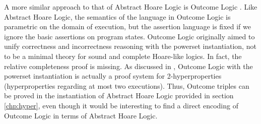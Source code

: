 \documentclass[
  10pt,       %
  twoside,    %
  a4paper,    %
  english,    %
  tikz,       %
  openright,  %
]{book}
\begin{document}
A more similar approach to that of Abstract Hoare Logic is Outcome Logic
\cite{Zilberstein23}. Like Abstract Hoare Logic, the semantics of the language
in Outcome Logic is parametric on the domain of execution, but the assertion
language is fixed if we ignore the basic assertions on program states. Outcome
Logic originally aimed to unify correctness and incorrectness reasoning with
the powerset instantiation, not to be a minimal theory for sound and complete
Hoare-like logics. In fact, the relative completeness proof is missing. As
discussed in \cite{Darnier2023}, Outcome Logic with the powerset instantiation
is actually a proof system for 2-hyperproperties (hyperproperties regarding at
most two executions). Thus, Outcome triples can be proved in the instantiation
of Abstract Hoare Logic provided in section \ref{chp:hyper}, even though it
would be interesting to find a direct encoding of Outcome Logic in terms of
Abstract Hoare Logic.


\backmatter
\cleardoublepage
{}
{}

\begingroup

\let\clearpage\relax
\let\cleardoublepage\relax


\printbibliography

\endgroup

\vfill
\end{document}
